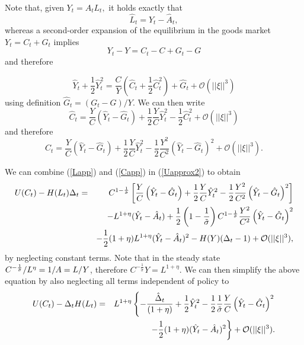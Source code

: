 \documentclass[11pt,aspectratio=169]{beamer}
\begin{document}
\begin{frame}\small
Note that, given $Y_{t}=A_{t}L_{t},$ it holds exactly that%
\begin{equation}
\hat{L}_{t}=\hat{Y}_{t}-\hat{A}_{t},  \label{Lapp}
\end{equation}%
whereas a second-order expansion of the equilibrium in the goods market $%
Y_{t}=C_{t}+G_{t}$ implies%
\begin{equation*}
Y_{t}-Y=C_{t}-C+G_{t}-G
\end{equation*}%
and therefore

\begin{equation*}
\hat{Y}_{t}+\frac{1}{2}\hat{Y}_{t}^{2}=\frac{C}{Y}\left( \hat{C}_{t}+\frac{1%
}{2}\hat{C}_{t}^{2}\right) +\hat{G}_{t}+\mathcal{O}(||\xi ||^{3})
\end{equation*}%
using definition $\hat{G}_{t}=(G_{t}-G)/Y.$ We can then write%
\begin{equation*}
\hat{C}_{t}=\frac{Y}{C}\left( \hat{Y}_{t}-\hat{G}_{t}\right) +\frac{1}{2}%
\frac{Y}{C}\hat{Y}_{t}^{2}-\frac{1}{2}\hat{C}_{t}^{2}+\mathcal{O}(||\xi
||^{3})
\end{equation*}%
and therefore%
\begin{equation}
\hat{C}_{t}=\frac{Y}{C}\left( \hat{Y}_{t}-\hat{G}_{t}\right) +\frac{1}{2}%
\frac{Y}{C}\hat{Y}_{t}^{2}-\frac{1}{2}\frac{Y^{2}}{C^{2}}\left( \hat{Y}_{t}-%
\hat{G}_{t}\right) ^{2}+\mathcal{O}(||\xi ||^{3}).  \label{Capp}
\end{equation}
\end{frame}
\begin{frame}\small
We can combine (\ref{Lapp}) and (\ref{Capp}) in (\ref{Uapprox2}) to obtain%
\begin{eqnarray*}
U(C_{t})-H(L_{t})\Delta _{t} &=&C^{1-\frac{1}{\tilde{\sigma}}}\left[ \frac{Y%
}{C}\left( \hat{Y}_{t}-\hat{G}_{t}\right) +\frac{1}{2}\frac{Y}{C}\hat{Y}%
_{t}^{2}-\frac{1}{2}\frac{Y^{2}}{C^{2}}\left( \hat{Y}_{t}-\hat{G}_{t}\right)
^{2}\right] \\
&&-L^{1+\eta }(\hat{Y}_{t}-\hat{A}_{t})+\frac{1}{2}\left( 1-\frac{1}{\tilde{%
\sigma}}\right) C^{1-\frac{1}{\tilde{\sigma}}}\frac{Y^{2}}{C^{2}}\left( \hat{%
Y}_{t}-\hat{G}_{t}\right) ^{2} \\
&&-\frac{1}{2}(1+\eta )L^{1+\eta }(\hat{Y}_{t}-\hat{A}_{t})^{2}-H(Y)(\Delta
_{t}-1)+\mathcal{O}(||\xi ||^{3}),
\end{eqnarray*}%
by neglecting constant terms. Note that in the steady state $C^{-\frac{1}{%
\tilde{\sigma}}}/L^{\eta }=1/A=L/Y$, therefore $C^{-\frac{1}{\tilde{\sigma}}%
}Y=L^{1+\eta }$. We can then simplify the above equation by also neglecting
all terms independent of policy to%
\begin{eqnarray*}
U(C_{t})-\Delta _{t}H(L_{t}) &=&L^{1+\eta }\left\{ -\frac{\hat{\Delta}_{t}}{%
(1+\eta )}+\frac{1}{2}\hat{Y}_{t}^{2}-\frac{1}{2}\frac{1}{\tilde{\sigma}}%
\frac{Y}{C}\left( \hat{Y}_{t}-\hat{G}_{t}\right) ^{2}\right. \\
&&\left. -\frac{1}{2}(1+\eta )(\hat{Y}_{t}-\hat{A}_{t})^{2}\right\} +%
\mathcal{O}(||\xi ||^{3}).
\end{eqnarray*}
\end{frame}
\end{document}
